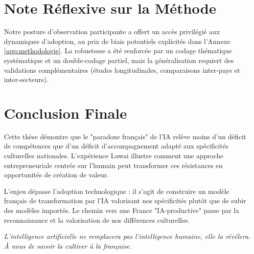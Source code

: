 \section{Note Réflexive sur la Méthode}
Notre posture d’observation participante a offert un accès privilégié aux dynamiques d’adoption, au prix de biais potentiels explicités dans l’Annexe \ref{app:methodologie}. La robustesse a été renforcée par un codage thématique systématique et un double-codage partiel, mais la généralisation requiert des validations complémentaires (études longitudinales, comparaisons inter-pays et inter-secteurs).

\section{Conclusion Finale}

Cette thèse démontre que le "paradoxe français" de l'IA relève moins d'un déficit de compétences que d'un déficit d'accompagnement adapté aux spécificités culturelles nationales. L'expérience Luwai illustre comment une approche entrepreneuriale centrée sur l'humain peut transformer ces résistances en opportunités de création de valeur.

L'enjeu dépasse l'adoption technologique : il s'agit de construire un modèle français de transformation par l'IA valorisant nos spécificités plutôt que de subir des modèles importés. Le chemin vers une France "IA-productive" passe par la reconnaissance et la valorisation de nos différences culturelles.

\emph{L'intelligence artificielle ne remplacera pas l'intelligence humaine, elle la révélera. À nous de savoir la cultiver à la française.}
